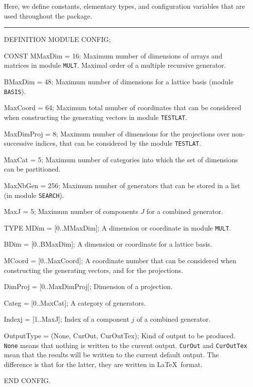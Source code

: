 
Here, we define constants, elementary types, and configuration variables 
that are used throughout the package.

\bigskip\hrule
\code

DEFINITION MODULE CONFIG;

CONST
   MMaxDim = 16;
\endcode
  \tabb  Maximum number of dimensions of arrays and matrices 
    in module {\tt MULT}.
    Maximal order of a multiple recursive generator.
  \endtabb
\code

   BMaxDim = 48;
\endcode
 \tabb  Maximum number of dimensions for a lattice basis (module {\tt BASIS}).
 \endtabb
\code

   MaxCoord = 64;
\endcode
  \tabb  Maximum total number of coordinates that can be considered when
    constructing the generating vectors in module {\tt TESTLAT}.
  \endtabb
\code

   MaxDimProj = 8;
\endcode
  \tabb  Maximum number of dimensions for the projections over 
    non-successive indices, 
    that can be considered by the module {\tt TESTLAT}.
  \endtabb
\code

   MaxCat = 5;
\endcode
  \tabb    Maximum number of categories into which the
   set of dimensions can be partitioned.
  \endtabb
\code

   MaxNbGen = 256;
\endcode
 \tabb Maximum number of generators that can be stored in a list
  (in module {\tt SEARCH}). \endtabb
\code

   MaxJ = 5;
\endcode
 \tabb Maximum number of components $J$ for a combined generator. \endtabb
\code

TYPE
   MDim = [0..MMaxDim];
\endcode
 \tabb  A dimension or coordinate in module {\tt MULT}.
 \endtabb
\code

   BDim = [0..BMaxDim];
\endcode
 \tabb  A dimension or coordinate for a lattice basis.
 \endtabb
\code

   MCoord = [0..MaxCoord];
\endcode
 \tabb  A coordinate number that can be considered when
    constructing the generating vectors, and for the projections.
 \endtabb
\code

   DimProj = [0..MaxDimProj];
\endcode
 \tabb  Dimension of a projection.
 \endtabb
\code

   Categ = [0..MaxCat];
\endcode
  \tabb  A category of generators.
 \endtabb
\code

   Indexj = [1..MaxJ];
\endcode
 \tabb  Index of a component $j$ of a combined generator.  \endtabb
\code

   OutputType = (None, CurOut, CurOutTex);
\endcode
 \tabb  Kind of output to be produced.
  {\tt None} means that nothing is written to the current output.
  {\tt CurOut} and {\tt CurOutTex} mean that the results will be
  written to the current default output. The difference is that for the
  latter, they are written in \LaTeX\ format.
 \endtabb
\code

END CONFIG.
\endcode
